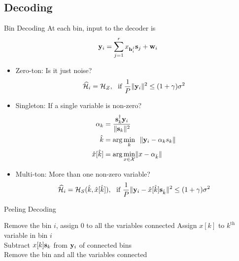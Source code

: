 \documentclass[10pt]{beamer}
\begin{document}
\subsection{Decoding}
\begin{frame}{Bin Decoding}
At each bin, input to the decoder is 
\begin{equation*}
 \mathbf{y}_i=\sum_{j=1}^{r}x_{\mathbf{h}_{i}^{j}}\mathbf{s}_j+\mathbf{w}_i
\end{equation*}
\begin{itemize}
\item Zero-ton: Is it just noise?
\begin{equation*}
\widehat{\mathcal{H}}_i=\mathcal{H}_{Z}, ~~\text{if } \frac{1}{P}\lVert{\mathbf{y}_i}\rVert^2\leq (1+\gamma)\sigma^2
\end{equation*}
\item Singleton: If a single variable is non-zero?
\begin{align*}
\alpha_{k}&=\frac{\mathbf{s}_k^{\dagger}\mathbf{y}_i}{\lVert{\mathbf{s}_k}\rVert^2}\\
\hat{k}&=\arg \min_{k}~~ \lVert{\mathbf{y}_i-\alpha_{k}s_k}\rVert\\
\hat{x}[\hat{k}]&=\arg \min_{x\in\mathcal{X}} \lVert{x-\alpha_{\hat{k}}}\rVert
\end{align*}
\item Multi-ton: More than one non-zero variable?
\begin{equation*}
\widehat{\mathcal{H}}_i=\mathcal{H}_{S}(\hat{k},\hat{x}[\hat{k}]), ~~\text{if } \frac{1}{P}\lVert{\mathbf{y}_{i}-\hat{x}[\hat{k}]\mathbf{s}_{\hat{k}}}\rVert^2\leq (1+\gamma)\sigma^2
\end{equation*}
\end{itemize}
\end{frame}

\begin{frame}{Peeling Decoding}
\begin{algorithmic}
    \State Remove the bin $i$, assign $0$ to all the variables connected
       \State Assign $x[k]$ to $k^{\text{th}}$ variable in bin $i$\\
  \hspace{6ex} Subtract $x[k]\mathbf{s}_k$ from $\mathbf{y}_i$ of connected bins\\
  \hspace{6ex} Remove the bin and all the variables connected
\EndIf
\EndWhile
\end{algorithmic}
\end{frame}
\end{document}

